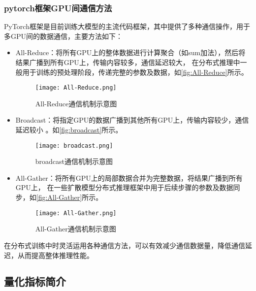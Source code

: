 \subsubsection{pytorch框架GPU间通信方法}
\label{sec:pytorch-communication}
PyTorch框架是目前训练大模型的主流代码框架，其中提供了多种通信操作，用于多GPU间的数据通信，主要方法如下：
\begin{itemize}
    \item All-Reduce：将所有GPU上的整体数据进行计算聚合（如sum加法），然后将结果广播到所有GPU上，传输内容较多，通信延迟较大，
    在分布式推理中一般用于训练的预处理阶段，传递完整的参数及数据\cite{torch.distributed}，如\autoref{fig:All-Reduce}所示。
    \begin{figure}[ht]
        \centering
        \texttt{[image: All-Reduce.png]}
        \caption{All-Reduce通信机制示意图\cite{All-Reduce-system}}\label{fig:All-Reduce}
    \end{figure}
    \item Broadcast：将指定GPU的数据广播到其他所有GPU上，传输内容较少，通信延迟较小\cite{torch.distributed}
    。如\autoref{fig:broadcast}所示。
    \begin{figure}[ht]
        \centering
        \texttt{[image: broadcast.png]}
        \caption{broadcast通信机制示意图\cite{All-Reduce-system}}\label{fig:broadcast}
    \end{figure}
    \item All-Gather：将所有GPU上的局部数据合并为完整数据，将结果广播到所有GPU上，
    在一些扩散模型分布式推理框架中用于后续步骤的参数及数据同步\cite{torch.distributed}，如\autoref{fig:All-Gather}所示。
    \begin{figure}[ht]
        \centering
        \texttt{[image: All-Gather.png]}
        \caption{All-Gather通信机制示意图\cite{All-Reduce-system}}\label{fig:All-Gather}
    \end{figure}
\end{itemize}
在分布式训练中时灵活运用各种通信方法，可以有效减少通信数据量，降低通信延迟，从而提高整体推理性能。

\subsection{量化指标简介}
